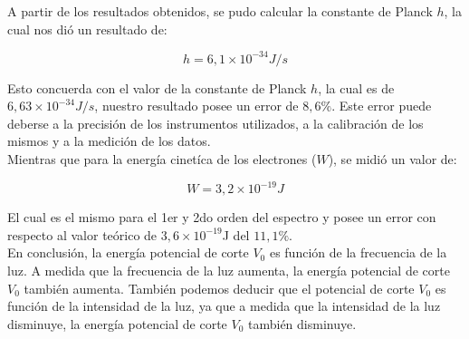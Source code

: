 \documentclass[a4paper]{article}
\begin{document}
\newpage
\noindent
\thispagestyle{fancy}
    \indent A partir de los resultados obtenidos, se pudo calcular la constante de Planck $h$, la cual nos dió un resultado de:
    

    \begin{equation}
      h = 6,1 \times 10^{-34} J/s
    \end{equation}
    

    \indent Esto concuerda con el valor de la constante de Planck $h$, la cual es de $6,63 \times 10^{-34} J/s$, nuestro resultado posee un error de $8,6\%$. Este error puede deberse a la precisión de los instrumentos utilizados, a la calibración de los mismos y a la medición de los datos.\\
    \indent Mientras que para la energía cinetíca de los electrones ($W$), se midió un valor de:
    

    \begin{equation}
      W = 3,2 \times 10^{-19} J
    \end{equation}

    \indent El cual es el mismo para el 1er y 2do orden del espectro y posee un error con respecto al valor teórico de $3,6 \times 10^{-19}$J del $11,1\%$.\\
    \indent En conclusión, la energía potencial de corte $V_{0}$ es función de la frecuencia de la luz. A medida que la frecuencia de la luz aumenta, la energía potencial de corte $V_{0}$ también aumenta. También podemos deducir que el potencial de corte $V_{0}$ es función de la intensidad de la luz, ya que a medida que la intensidad de la luz disminuye, la energía potencial de corte $V_{0}$ también disminuye.
\end{document}
